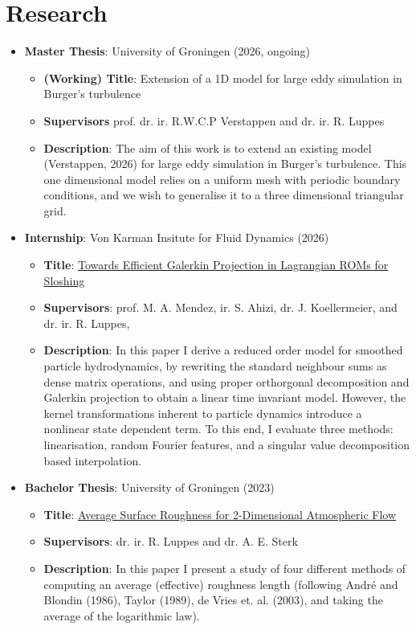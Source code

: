 \documentclass[10pt]{article}
\begin{document}
\section*{Research}
\begin{itemize}
    \item \textbf{Master Thesis}: University of Groningen (2026, ongoing) \begin{itemize}
        \item \textbf{(Working) Title}: Extension of a 1D model for large eddy simulation in Burger’s turbulence
        \item \textbf{Supervisors} prof. dr. ir. R.W.C.P Verstappen and dr. ir. R. Luppes 
        \item \textbf{Description}: The aim of this work is to extend an
        existing model (Verstappen, 2026) for large eddy simulation in Burger’s turbulence. This
        one dimensional
        model relies on a uniform mesh with periodic boundary conditions, and we
        wish to generalise it to a three dimensional triangular grid. 
    \end{itemize}
    \item \textbf{Internship}: Von Karman Insitute for Fluid Dynamics (2026) \begin{itemize}
        \item \textbf{Title}: \href{https://fse.studenttheses.ub.rug.nl/37239/1/mAppM2026MandevilleMA.pdf}{Towards Efficient Galerkin Projection in
        Lagrangian ROMs for Sloshing}
        \item \textbf{Supervisors}: prof. M. A. Mendez, ir. S. Ahizi,  dr. J. Koellermeier, and dr. ir. R.
        Luppes,
        \item \textbf{Description}: In this paper I derive a reduced order model for
        smoothed particle hydrodynamics, by rewriting the standard neighbour
        sums as dense matrix operations, and using proper orthorgonal
        decomposition and Galerkin projection to obtain a linear time invariant
        model. However, the kernel transformations inherent to particle dynamics
        introduce a nonlinear state dependent term. To this end, I evaluate
        three methods: linearisation, random Fourier features, and a singular
        value decomposition based interpolation. 
    \end{itemize}
    \item \textbf{Bachelor Thesis}: University of Groningen (2023) \begin{itemize}
        \item \textbf{Title}: \href{https://fse.studenttheses.ub.rug.nl/30589/1/bAppM_2023_MandevilleMA.pdf}{Average Surface Roughness for 2-Dimensional Atmospheric Flow}
        \item \textbf{Supervisors}: dr. ir. R. Luppes and dr. A. E. Sterk 
        \item \textbf{Description}: In this paper I present a study of four different methods of computing an
        average (effective) roughness length (following André and Blondin (1986), Taylor
        (1989), de Vries et. al. (2003), and taking the average of the
        logarithmic law).
    \end{itemize}
\end{itemize}
\end{document}
